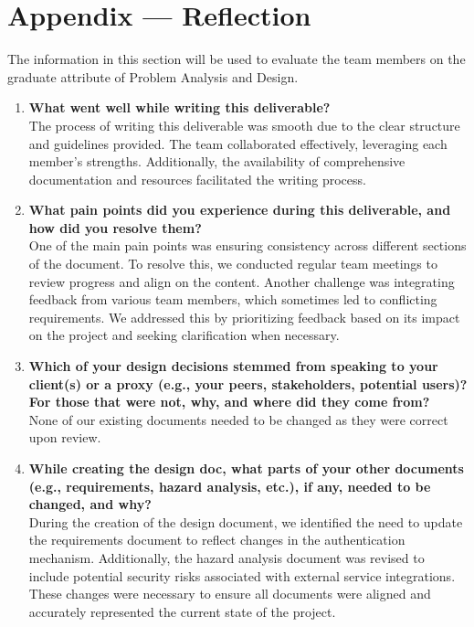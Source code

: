 \documentclass[12pt, titlepage]{article}
\begin{document}
\section*{Appendix --- Reflection}

The information in this section will be used to evaluate the team members on the
graduate attribute of Problem Analysis and Design.



\begin{enumerate}
  \item \textbf{What went well while writing this deliverable?}   \\
  The process of writing this deliverable was smooth due to the clear structure and guidelines provided. The team collaborated effectively, leveraging each member's strengths. Additionally, the availability of comprehensive documentation and resources facilitated the writing process.

  \item \textbf{What pain points did you experience during this deliverable, and how did you resolve them?}  \\
  One of the main pain points was ensuring consistency across different sections of the document. To resolve this, we conducted regular team meetings to review progress and align on the content. Another challenge was integrating feedback from various team members, which sometimes led to conflicting requirements. We addressed this by prioritizing feedback based on its impact on the project and seeking clarification when necessary.

  \item \textbf{Which of your design decisions stemmed from speaking to your client(s) or a proxy (e.g., your peers, stakeholders, potential users)? For those that were not, why, and where did they come from?}  \\
  None of our existing documents needed to be changed as they were correct upon review.

  \item \textbf{While creating the design doc, what parts of your other documents (e.g., requirements, hazard analysis, etc.), if any, needed to be changed, and why?}  \\
  During the creation of the design document, we identified the need to update the requirements document to reflect changes in the authentication mechanism. Additionally, the hazard analysis document was revised to include potential security risks associated with external service integrations. These changes were necessary to ensure all documents were aligned and accurately represented the current state of the project.


\end{enumerate}
\end{document}
